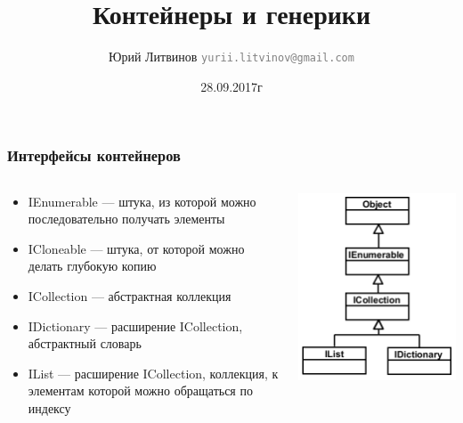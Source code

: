 \documentclass[xetex,mathserif,serif]{beamer}
\title{Контейнеры и генерики}
\author[Юрий Литвинов]{Юрий Литвинов \newline \textcolor{gray}{\small\texttt{yurii.litvinov@gmail.com}}}
\date{28.09.2017г}
\begin{document}
	\frame{\titlepage}

	\begin{frame}
		\frametitle{Интерфейсы контейнеров}
		\begin{columns}
			\begin{column}{0.65\textwidth}
				\begin{itemize}
					\item IEnumerable --- штука, из которой можно последовательно получать элементы
					\item ICloneable --- штука, от которой можно делать глубокую копию
					\item ICollection --- абстрактная коллекция
					\item IDictionary --- расширение ICollection, абстрактный словарь
					\item IList --- расширение ICollection, коллекция, к элементам которой можно обращаться по индексу
				\end{itemize}
			\end{column}
			\begin{column}{0.3\textwidth}
				\includegraphics[width=\textwidth]{interfaces.png}
			\end{column}
		\end{columns}
	\end{frame}
\end{document}
